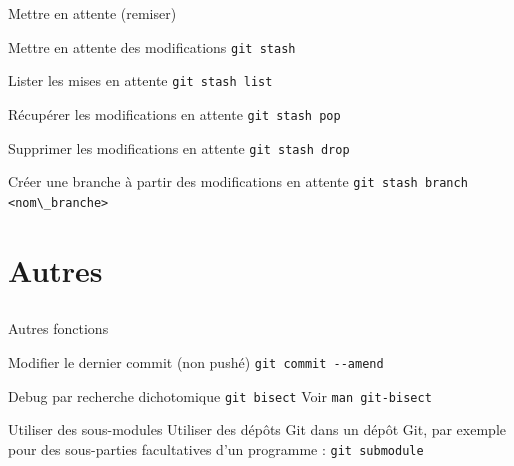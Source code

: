 \documentclass{beamer}
\begin{document}
\begin{frame}[fragile]{Mettre en attente (remiser)}
  \begin{block}{Mettre en attente des modifications}
    \textcolor{commandcolor}{\verb?git stash?}
  \end{block}
  \begin{block}{Lister les mises en attente}
    \textcolor{commandcolor}{\verb?git stash list?}
  \end{block}
  \begin{block}{Récupérer les modifications en attente}
    \textcolor{commandcolor}{\verb?git stash pop?}
  \end{block}
  \begin{block}{Supprimer les modifications en attente}
    \textcolor{commandcolor}{\verb?git stash drop?}
  \end{block}
  \begin{block}{Créer une branche à partir des modifications en attente}
    \textcolor{commandcolor}{\verb?git stash branch <nom\_branche> ?}
  \end{block}
\end{frame}

\section{Autres}
\subsection{}

\begin{frame}[fragile]{Autres fonctions}
  \begin{block}{Modifier le dernier commit (non pushé)}
    \textcolor{commandcolor}{\verb?git commit --amend?}
  \end{block}
  \begin{block}{Debug par recherche dichotomique}
    \textcolor{commandcolor}{\verb?git bisect?}\newline
    Voir \textcolor{commandcolor}{\verb?man git-bisect?}
  \end{block}
  \begin{block}{Utiliser des sous-modules}
    Utiliser des dépôts Git dans un dépôt Git, par exemple pour des sous-parties facultatives d'un programme :\linebreak
    \textcolor{commandcolor}{\verb?git submodule?}
  \end{block}
\end{frame}
\end{document}
